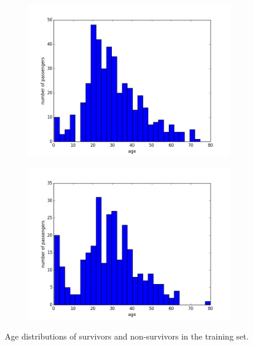 \documentclass[english, a4paper]{article}
\begin{document}
\begin{figure}[H]
    \begin{subfigure}{.5\textwidth}
        \includegraphics[width=\linewidth]{non_survivor_age_distribution}
    \end{subfigure}
    \begin{subfigure}{.5\textwidth}
        \includegraphics[width=\linewidth]{survivor_age_distribution}
    \end{subfigure}
    \caption{Age distributions of survivors and non-survivors in the training set.}
    \label{fig:survivor_split_age_histograms}
\end{figure}
\end{document}

